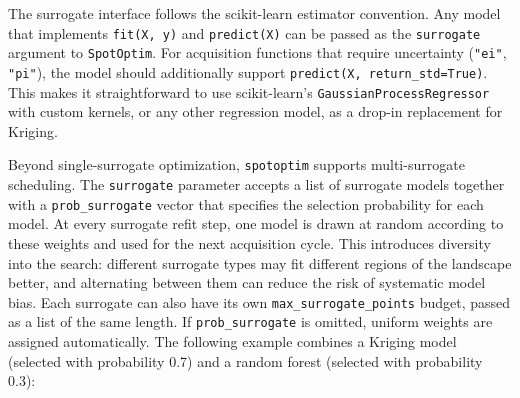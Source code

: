 \documentclass[
  twocolumn]{article}
\begin{document}
The surrogate interface follows the scikit-learn estimator convention.
Any model that implements \texttt{fit(X,\ y)} and \texttt{predict(X)}
can be passed as the \texttt{surrogate} argument to \texttt{SpotOptim}.
For acquisition functions that require uncertainty (\texttt{"ei"},
\texttt{"pi"}), the model should additionally support
\texttt{predict(X,\ return\_std=True)}. This makes it straightforward to
use scikit-learn's \texttt{GaussianProcessRegressor} with custom
kernels, or any other regression model, as a drop-in replacement for
Kriging.

Beyond single-surrogate optimization, \texttt{spotoptim} supports
multi-surrogate scheduling. The \texttt{surrogate} parameter accepts a
list of surrogate models together with a \texttt{prob\_surrogate} vector
that specifies the selection probability for each model. At every
surrogate refit step, one model is drawn at random according to these
weights and used for the next acquisition cycle. This introduces
diversity into the search: different surrogate types may fit different
regions of the landscape better, and alternating between them can reduce
the risk of systematic model bias. Each surrogate can also have its own
\texttt{max\_surrogate\_points} budget, passed as a list of the same
length. If \texttt{prob\_surrogate} is omitted, uniform weights are
assigned automatically. The following example combines a Kriging model
(selected with probability 0.7) and a random forest (selected with
probability 0.3):
\end{document}
